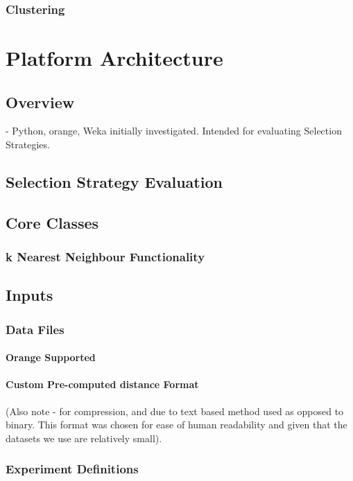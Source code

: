 \documentclass[a4paper,11pt]{report}
\begin{document}
\subsection{Clustering}

\chapter{Platform Architecture}
\section{Overview}
- Python, orange, Weka initially investigated. Intended for evaluating Selection Strategies.

\section{Selection Strategy Evaluation}

\section{Core Classes}
\subsection{k Nearest Neighbour Functionality}
\section{Inputs}
\subsection{Data Files}
\subsubsection{Orange Supported}

\subsubsection{Custom Pre-computed distance Format}

(Also note - for compression, and due to text based method used as opposed to binary. This format was chosen for ease of human readability and given that the datasets we use are relatively small).

\subsection{Experiment Definitions}
\end{document}
